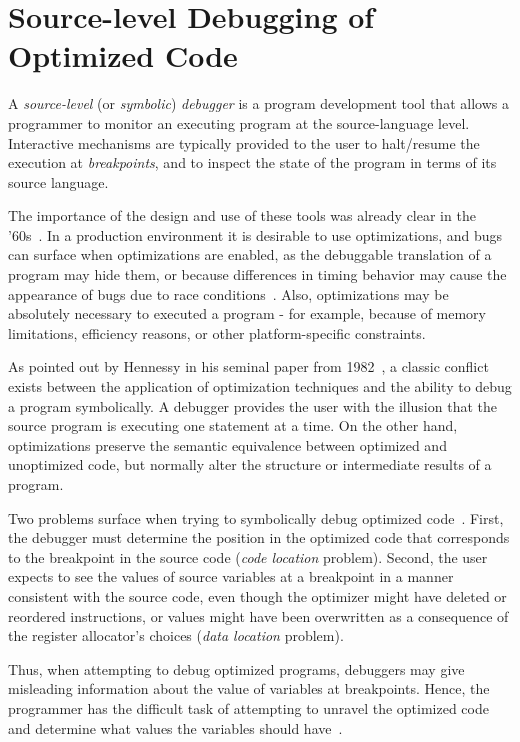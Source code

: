 \section{Source-level Debugging of Optimized Code}
A {\em source-level} (or {\em symbolic}) {\em debugger} is a program development tool that allows a programmer to monitor an executing program at the source-language level. Interactive mechanisms are typically provided to the user to halt/resume the execution at {\em breakpoints}, and to inspect the state of the program in terms of its source language.

The importance of the design and use of these tools was already clear in the '60s~\cite{Evans66}. In a production environment it is desirable to use optimizations, and bugs can surface when optimizations are enabled, as the debuggable translation of a program may hide them, or because differences in timing behavior may cause the appearance of bugs due to race conditions~\cite{Adl-Tabatabai96thesis}. Also, optimizations may be absolutely necessary to executed a program - for example, because of memory limitations, efficiency reasons, or other platform-specific constraints.

As pointed out by Hennessy in his seminal paper from 1982~\cite{Hennessy82}, a classic conflict exists between the application of optimization techniques and the ability to debug a program symbolically. A debugger provides the user with the illusion that the source program is executing one statement at a time. On the other hand, optimizations preserve the semantic equivalence between optimized and unoptimized code, but normally alter the structure or intermediate results of a program.

Two problems surface when trying to symbolically debug optimized code~\cite{Adl-Tabatabai96,Jaramillo00}. First, the debugger must determine the position in the optimized code that corresponds to the breakpoint in the source code ({\em code location} problem). Second, the user expects to see the values of source variables at a breakpoint in a manner consistent with the source code, even though the optimizer might have 
deleted or reordered instructions, or values might have been overwritten as a consequence of the register allocator's choices ({\em data location} problem).

Thus, when attempting to debug optimized programs, debuggers may give misleading information about the value of variables at breakpoints. Hence, the programmer has the difficult task of attempting to unravel the optimized code and determine what values the variables should have~\cite{Hennessy82}.

